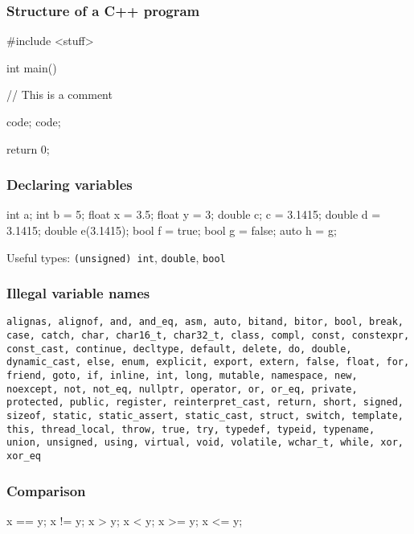 
\begin{frame}[fragile]
  \frametitle{Structure of a C++ program}

\begin{c++}
#include <stuff>

int main()
{
  // This is a comment

  code;
  code;

  return 0;
}

\end{c++}

\end{frame}

\begin{frame}[fragile]
  \frametitle{Declaring variables}

\begin{c++}
int a;
int b = 5;
float x = 3.5;
float y = 3;
double c;
c = 3.1415;
double d = 3.1415;
double e(3.1415);
bool f = true;
bool g = false;
auto h = g;
\end{c++}

\bigskip

Useful types:
\texttt{(unsigned) int},
\texttt{double},
\texttt{bool}

\end{frame}

\begin{frame}[fragile]
  \frametitle{Illegal variable names}

\texttt{alignas, alignof, and, and\_eq, asm, auto, bitand, bitor, bool, break, case, catch, char, char16\_t, char32\_t, class, compl, const, constexpr, const\_cast, continue, decltype, default, delete, do, double, dynamic\_cast, else, enum, explicit, export, extern, false, float, for, friend, goto, if, inline, int, long, mutable, namespace, new, noexcept, not, not\_eq, nullptr, operator, or, or\_eq, private, protected, public, register, reinterpret\_cast, return, short, signed, sizeof, static, static\_assert, static\_cast, struct, switch, template, this, thread\_local, throw, true, try, typedef, typeid, typename, union, unsigned, using, virtual, void, volatile, wchar\_t, while, xor, xor\_eq}

\end{frame}

\begin{frame}[fragile]
  \frametitle{Comparison}

\begin{c++}
x == y;
x != y;
x > y;
x < y;
x >= y;
x <= y;
\end{c++}

\end{frame}


